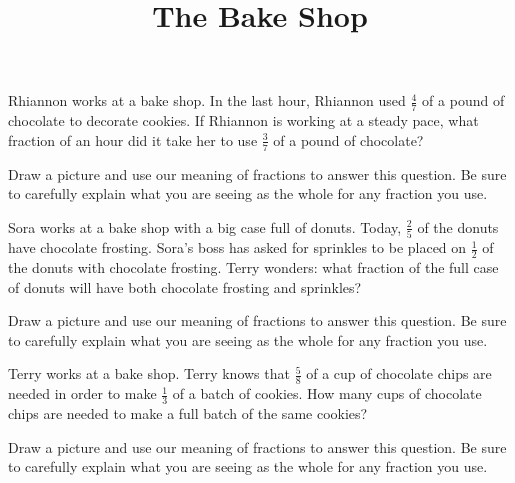\documentclass[nooutcomes,noauthor, handout]{ximera}
\title{The Bake Shop}
\begin{document}
\begin{abstract}
\end{abstract}

\maketitle

\begin{problem}
Rhiannon works at a bake shop. In the last hour, Rhiannon used $\frac{4}{7}$ of a pound of chocolate to decorate cookies. If Rhiannon is working at a steady pace, what fraction of an hour did it take her to use $\frac{3}{7}$ of a pound of chocolate?

Draw a picture and use our meaning of fractions to answer this question. Be sure to carefully explain what you are seeing as the whole for any fraction you use.
\end{problem}

\begin{problem}
Sora works at a bake shop with a big case full of donuts. Today, $\frac{2}{5}$ of the donuts have chocolate frosting. Sora's boss has asked for sprinkles to be placed on $\frac{1}{2}$ of the donuts with chocolate frosting. Terry wonders: what fraction of the full case of donuts will have both chocolate frosting and sprinkles?

Draw a picture and use our meaning of fractions to answer this question. Be sure to carefully explain what you are seeing as the whole for any fraction you use.
\end{problem}


\begin{problem}
Terry works at a bake shop. Terry knows that $\frac{5}{8}$ of a cup of chocolate chips are needed  in order to make $\frac{1}{3}$ of a batch of cookies. How many cups of chocolate chips are needed to make a full batch of the same cookies?

Draw a picture and use our meaning of fractions to answer this question. Be sure to carefully explain what you are seeing as the whole for any fraction you use.
\end{problem}





\newpage
\end{document}
